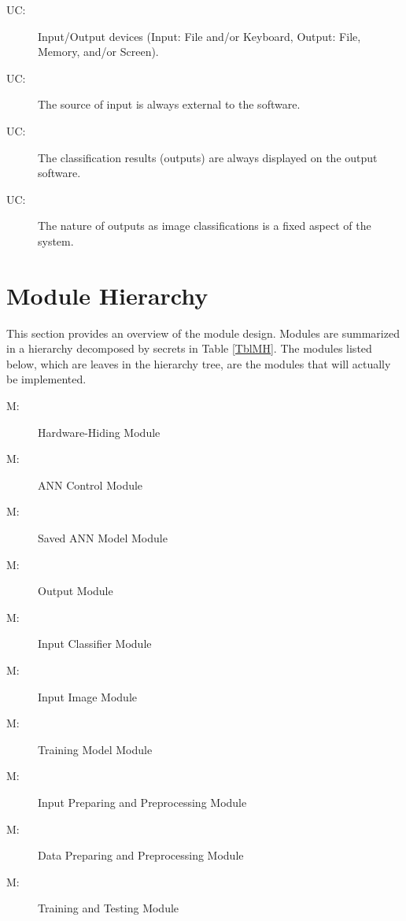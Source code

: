 \documentclass[12pt, titlepage]{article}
\newcounter{ucnum}
\newcommand{\uctheucnum}{UC\theucnum}
\newcounter{mnum}
\newcommand{\mthemnum}{M\themnum}
\begin{document}
\begin{description}
\item[ \uctheucnum \label{ucIO}:] Input/Output devices
  (Input: File and/or Keyboard, Output: File, Memory, and/or Screen).
\item[ \uctheucnum \label{ucIO}:] The source of input 
  is always external to the software.
\item[ \uctheucnum \label{ucIO}:] The classification results
 (outputs) are always displayed on the output software.
\item[ \uctheucnum \label{ucIO}:] The nature of outputs as 
image classifications is a fixed aspect of the system.
\end{description}

\section{Module Hierarchy} \label{SecMH}

This section provides an overview of the module design. Modules are summarized
in a hierarchy decomposed by secrets in Table \ref{TblMH}. The modules listed
below, which are leaves in the hierarchy tree, are the modules that will
actually be implemented.

\begin{description}
\item [ \mthemnum \label{HW}:] Hardware-Hiding Module
\item [ \mthemnum \label{ACM}:] ANN Control Module
\item [ \mthemnum \label{SavedANN}:] Saved ANN Model Module
\item [ \mthemnum \label{Output}:] Output Module
\item [ \mthemnum \label{In-class}:] Input Classifier Module
\item [ \mthemnum \label{In-set}:] Input Image Module
\item [ \mthemnum \label{Train-Model}:] Training Model Module
\item [ \mthemnum \label{In-prep}:] Input Preparing and Preprocessing Module
\item [ \mthemnum \label{Data}:] Data Preparing and Preprocessing Module
\item [ \mthemnum \label{Train}:] Training and Testing Module
\end{description}
\end{document}
